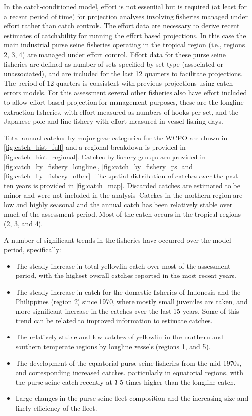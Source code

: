 In the catch-conditioned model, effort is not essential but is required (at least for a recent period of time) for projection analyses involving fisheries managed under effort rather than catch controls. The effort data are necessary to derive recent estimates of catchability for running the effort based projections. In this case the main industrial purse seine fisheries operating in the tropical region (i.e., regions 2, 3, 4) are managed under effort control. Effort data for these purse seine fisheries are defined as number of sets specified by set type (associated or unassociated), and are included for the last 12 quarters to facilitate projections. The period of 12 quarters is consistent with previous projections using catch errors models. For this assessment several other fisheries also have effort included to allow effort based projection for management purposes, these are the longline extraction fisheries, with effort measured as numbers of hooks per set, and the Japanese pole and line fishery with effort measured in vessel fishing days.

Total annual catches by major gear categories for the WCPO are shown in \autoref{fig:catch_hist_full} and a regional breakdown is provided in \autoref{fig:catch_hist_regional}. Catches by fishery groups are provided in \autoref{fig:catch_by_fishery_longline}, \autoref{fig:catch_by_fishery_ps} and \autoref{fig:catch_by_fishery_other}. The spatial distribution of catches over the past ten years is provided in \autoref{fig:catch_map}. Discarded catches are estimated to be minor and were not included in the analysis. Catches in the northern region are low and highly seasonal and the annual catch has been relatively stable over much of the assessment period. Most of the catch occurs in the tropical regions (2, 3, and 4).

A number of significant trends in the fisheries have occurred over the model period, specifically:

\begin{itemize}
  \item The steady increase in total yellowfin catch over most of the assessment period, with the highest overall catches reported in the most recent years.
  \item The steady increase in catch for the domestic fisheries of Indonesia and the Philippines (region 2) since 1970, where mostly small juveniles are taken, and more significant increase in the catches over the last 15 years. Some of this trend can be related to improved information to estimate catches.
  \item The relatively stable and low catches of yellowfin in the northern and southern temperate regions by longline vessels (regions 1, and 5).
  \item The development of the equatorial purse-seine fisheries from the mid-1970s, and corresponding increased catches, particularly in equatorial regions, with the purse seine catch recently at 3-5 times higher than the longline catch.
  \item Large changes in the purse seine fleet composition and the increasing size and likely efficiency of the fleet.
\end{itemize}

